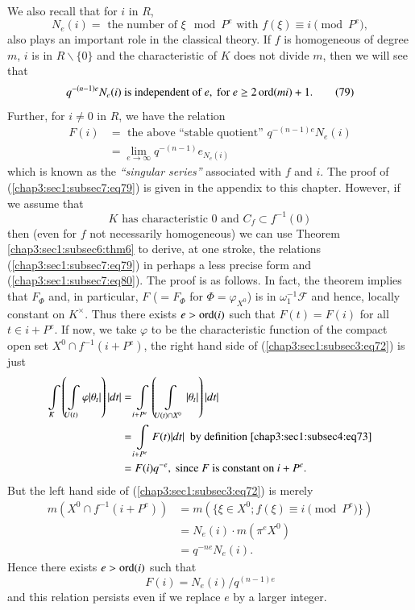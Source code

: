We also recall that for $i$ in $R$,
$$
N_{e}(i)= \text{ \ the number of \ } \xi \mod P^{e} \text{ \ with \ }
f(\xi)\equiv i \pmod{P^{e}},
$$
also plays an important role in the classical theory. If $f$ is
homogeneous of degree $m$, $i$ is in $R\backslash\{0\}$ and the
characteristic of $K$ does not divide $m$, then we will see that
\begin{equation*}
q^{-(n-1)e}N_{e}(i) \text{ is independent of } e, \text{ for } e\geq 2
\operatorname{ord} (mi)+1.\tag{79}\label{chap3:sec1:subsec7:eq79}
\end{equation*}
Further, for $i\neq 0$ in $R$, we have the relation
\begin{align*}
F(i) &= \text{ the above ``stable quotient'' }
q^{-(n-1)e}N_{e}(i)\tag{80}\label{chap3:sec1:subsec7:eq80}\\
&= \lim\limits_{e\to \infty}q^{-(n-1)}e_{N_{e}(i)}
\end{align*}
which is known as the {\em ``singular series''} associated with $f$
and $i$. The proof of (\ref{chap3:sec1:subsec7:eq79}) is given in the
appendix to this chapter. However, if we assume that
$$
K \text{ has characteristic } 0 \text{ and } C_{f}\subset f^{-1}(0)
$$
then (even for $f$ not necessarily homogeneous) we can use Theorem
\ref{chap3:sec1:subsec6:thm6} to derive, at one stroke, the relations
(\ref{chap3:sec1:subsec7:eq79}) in 
perhaps a less precise form and (\ref{chap3:sec1:subsec7:eq80}). The proof is as
follows. In fact, the theorem implies that $F_{\Phi}$ and, in
particular, $F$ ($=F_{\Phi}$ for $\Phi=\varphi_{X^{0}}$) is in
$\omega^{-1}_{1}\mathscr{F}$ and hence, locally constant on
$K^{\times}$. Thus there exists $e>\operatorname{ord}(i)$ such that $F(t)=F(i)$ for
all $t\in i+P^{e}$. If now, we take $\varphi$ to be the\pageoriginale
characteristic function of the compact open set $X^{0}\cap
f^{-1}(i+P^{e})$, the right hand side of (\ref{chap3:sec1:subsec3:eq72}) is just
\begin{align*}
\int\limits_{K}\left(\int\limits_{U(t)}\varphi|\theta_{t}|\right)|dt|
&= \int\limits_{i+P^{e}}\left(\int\limits_{U(t)\cap
  X^{0}}|\theta_{t}|\right)|dt|\\
&= \int\limits_{i+P^{e}}F(t)|dt|\text{ \ by definition
  \ref{chap3:sec1:subsec4:eq73}}\\ 
&= F(i)q^{-e}, \text{ since } F \text{ is constant on } i+P^{e}.
\end{align*}
But the left hand side of (\ref{chap3:sec1:subsec3:eq72}) is merely
\begin{align*}
m(X^{0}\cap f^{-1}(i+P^{e})) &= m(\{\xi\in X^{0};f(\xi)\equiv i \pmod{
P^{e}}\})\\
&= N_{e}(i)\cdot m(\pi^{e}X^{0})\\
&= q^{-ne}N_{e}(i).
\end{align*}
Hence there exists $e>\operatorname{ord}(i)$ such that
$$
F(i)=N_{e}(i)/q^{(n-1)e}
$$
and this relation persists even if we replace $e$ by a larger integer.


